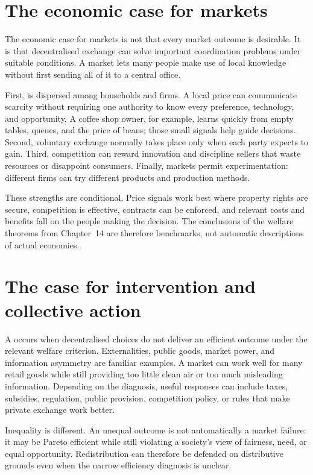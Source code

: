\section{The economic case for markets}

The economic case for markets is not that every market outcome is desirable.
It is that decentralised exchange can solve important coordination problems
under suitable conditions. A market lets many people make use of local
knowledge without first sending all of it to a central office.

First,  is dispersed among households and
firms. A local price can communicate scarcity without requiring one authority
to know every preference, technology, and opportunity. A coffee shop owner,
for example, learns quickly from empty tables, queues, and the price of beans;
those small signals help guide decisions. Second, voluntary exchange normally
takes place only when each party expects to gain. Third, competition can reward
innovation and discipline sellers that waste resources or disappoint consumers.
Finally, markets permit experimentation: different firms can try different
products and production methods.

These strengths are conditional. Price signals work best where property rights
are secure, competition is effective, contracts can be enforced, and relevant
costs and benefits fall on the people making the decision. The conclusions of
the welfare theorems from Chapter~14 are therefore benchmarks, not automatic
descriptions of actual economies.

\section{The case for intervention and collective action}

A  occurs when decentralised choices do not deliver an
efficient outcome under the relevant welfare criterion. Externalities, public
goods, market power, and information asymmetry are familiar examples. A market
can work well for many retail goods while still providing too little clean air
or too much misleading information. Depending on the diagnosis, useful
responses can include taxes, subsidies, regulation, public provision,
competition policy, or rules that make private exchange work better.

Inequality is different. An unequal outcome is not automatically a market
failure: it may be Pareto efficient while still violating a society's view of
fairness, need, or equal opportunity. Redistribution can therefore be defended
on distributive grounds even when the narrow efficiency diagnosis is unclear.

